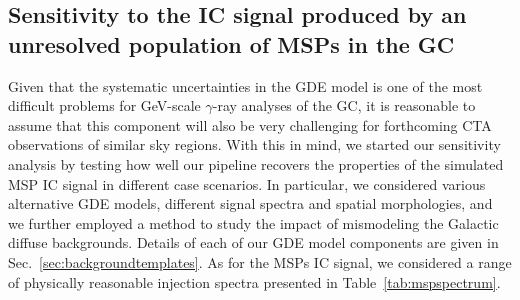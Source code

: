 \documentclass[doublespace,draft,nopageskip]{VTthesis} %
\begin{document}
\subsection{Sensitivity to the IC signal produced by an unresolved population of MSPs in the GC}
\label{subsec:sensitivityICMSPs}

Given that the systematic uncertainties in the GDE model is one of the most difficult problems for GeV-scale $\gamma$-ray analyses of the GC, it is reasonable to assume that this component will also be very challenging for forthcoming CTA observations of similar sky regions. With this in mind, we started our sensitivity analysis by testing how well our pipeline recovers the properties of the simulated MSP IC signal in different case scenarios. In particular, we considered various alternative GDE models, different signal spectra and spatial morphologies, and we further employed a method to study the impact of mismodeling the Galactic diffuse backgrounds. Details of each of our GDE model components are given in Sec.~\ref{sec:backgroundtemplates}. As for the MSPs IC signal, we considered a range of physically reasonable injection spectra presented in Table~\ref{tab:mspspectrum}.
\end{document}
